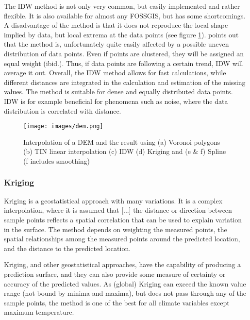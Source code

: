 The IDW method is not only very common, but easily implemented and rather flexible. It is also available for almost any FOSSGIS, but has some shortcomings. A disadvantage of the method is that it does not reproduce the local shape implied by data, but local extrema at the data points (see figure \ref{fig:dem_mitas}). \cite{mitas_spatial_1999} \citeauthor{lam_spatial_2009} points out that the method is, unfortunately quite easily affected by a possible uneven distribution of data points. Even if points are clustered, they will be assigned an equal weight (ibid.). Thus, if data points are following a certain trend, IDW will average it out. 
Overall, the IDW method allows for fast calculations, while different distances are integrated in the calculation and estimation of the missing values. \cite{gitta_raumliche_2016} The method is suitable for dense and equally distributed data points. \cite{wasser_going_2020} IDW is for example beneficial for phenomena such as noise, where the data distribution is correlated with distance. \cite{gis_resources_choosing_2013}

\begin{figure}
	\texttt{[image: images/dem.png]}
	\caption{Interpolation of a DEM and the result using (a) Voronoi polygons (b) TIN linear interpolation (c) IDW (d) Kriging and (e \& f) Spline (f includes smoothing) \cite{mitas_spatial_1999}}
	\label{fig:dem_mitas}
\end{figure}


\subsubsection{Kriging}

Kriging is a geostatistical approach with many variations. It is a complex interpolation, where it is assumed that \ldq{}[...] the distance or direction between sample points reflects a spatial correlation that can be used to explain variation in the surface\rdq{}. \cite[p.11605]{elumalai_spatial_2017} The method depends on weighting the measured points, the spatial relationships among the measured points around the predicted location, and the distance to the predicted location. \cite{wenjing_cao_study_2009}

Kriging, and other geostatistical approaches, have the capability of producing a prediction surface, and they can also provide some measure of certainty or accuracy of the predicted values. \cite{samanta_interpolation_2012} As (global) Kriging can exceed the known value range (not bound by minima and maxima), but does not pass through any of the sample points, the method is one of the best for all climate variables except maximum temperature. \cite{gis_resources_choosing_2013}

